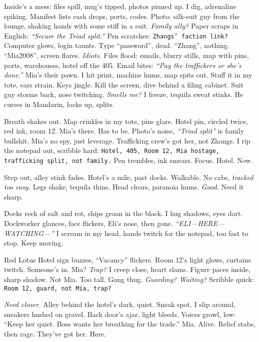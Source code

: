 \documentclass[12pt]{article}
\newcommand{\note}[1]{\texttt{#1}}
\begin{document}
Inside’s a mess: files spill, mug’s tipped, photos pinned up. I dig, adrenaline spiking. Manifest lists cash drops, ports, codes. Photo: silk-suit guy from the lounge, shaking hands with some stiff in a suit. \textit{Family ally?} Paper scraps in English: \textit{“Secure the Triad split.”} Pen scratches: \note{Zhangs’ faction link?} Computer glows, login taunts. Type “password”, dead. “Zhang”, nothing. “Mia2008”, screen flares. \textit{Idiots.} Files flood: emails, blurry stills, map with pins, ports, warehouses, hotel off the 405. Email bites: \textit{“Pay the traffickers or she’s done.”} \textnormal{Mia}’s their pawn. I hit print, machine hums, map spits out. Stuff it in my tote, ears strain. Keys jingle. Kill the screen, dive behind a filing cabinet. Suit guy storms back, nose twitching. \textit{Smells me?} I freeze, tequila sweat stinks. He curses in Mandarin, locks up, splits.

Breath shakes out. Map crinkles in my tote, pins glare. Hotel pin, circled twice, red ink, room 12. \textnormal{Mia}’s there. Has to be. Photo’s noise, \textit{“Triad split”} is family bullshit. \textnormal{Mia}’s no spy, just leverage. Trafficking crew’s got her, not Zhangs. I rip the notepad out, scribble hard: \note{Hotel, 405, Room 12, Mia hostage, trafficking split, not family.} Pen trembles, ink smears. Focus. Hotel. Now.

Step out, alley stink fades. Hotel’s a mile, past docks. Walkable. No cabs, \textit{tracked too easy.} Legs shake, tequila thins. Head clears, paranoia hums. \textit{Good.} Need it sharp.

Docks reek of salt and rot, ships groan in the black. I hug shadows, eyes dart. Dockworker glances, face flickers, \textnormal{Eli}’s nose, then gone. \textit{“ELI—HERE—WATCHING—”} I scream in my head, hands twitch for the notepad, too fast to stop. Keep moving.

Red Lotus Hotel sign buzzes, “Vacancy” flickers. Room 12’s light glows, curtains twitch. Someone’s in. \textnormal{Mia}? \textit{Trap?} I creep close, heart slams. Figure paces inside, sharp shadow. Not \textnormal{Mia}. Too tall. Gang thug. \textit{Guarding? Waiting?} Scribble quick: \note{Room 12, guard, not Mia, trap?}

\textit{Need closer.} Alley behind the hotel’s dark, quiet. Sneak spot. I slip around, sneakers hushed on gravel. Back door’s ajar, light bleeds. Voices growl, low: “Keep her quiet. Boss wants her breathing for the trade.” \textnormal{Mia}. Alive. Relief stabs, then rage. They’ve got her. Here.
\end{document}
